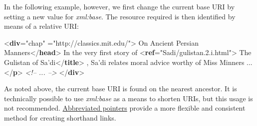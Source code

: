 In the following example, however, we first change the current base URI by setting a new value for {\itshape xml:base}. The resource required is then identified by means of a relative URI: \par\bgroup{}\exampleFont \begin{shaded}\noindent\mbox{}{<\textbf{div}\hspace*{1em}{type}="{chap}"\mbox{}\newline 
\hspace*{1em}{xml:base}="{http://classics.mit.edu/}">}\mbox{}\newline 
{}On Ancient Persian Manners{</\textbf{head}>}\mbox{}\newline 
{}In the very first story of {<\textbf{ref}\hspace*{1em}{target}="{Sadi/gulistan.2.i.html}">}\mbox{}\newline 
\hspace*{1em}\hspace*{1em}The Gulistan of\mbox{}\newline 
\hspace*{1em}\hspace*{1em}\hspace*{1em}\hspace*{1em}\hspace*{1em}\hspace*{1em} Sa'di{</\textbf{title}>}\mbox{}\newline 
\hspace*{1em},\mbox{}\newline 
\hspace*{1em}\hspace*{1em} Sa'di relates moral advice worthy of Miss Minners ...{</\textbf{p}>}\mbox{}\newline 
\textit{<!-- ... -->}\mbox{}\newline 
{</\textbf{div}>}\end{shaded}\egroup\par \par
As noted above, the current base URI is found on the nearest ancestor. It is technically possible to use {\itshape xml:base} as a means to shorten URIs, but this usage is not recommended. \hyperref[SAPU]{Abbreviated pointers} provide a more flexible and consistent method for creating shorthand links.
